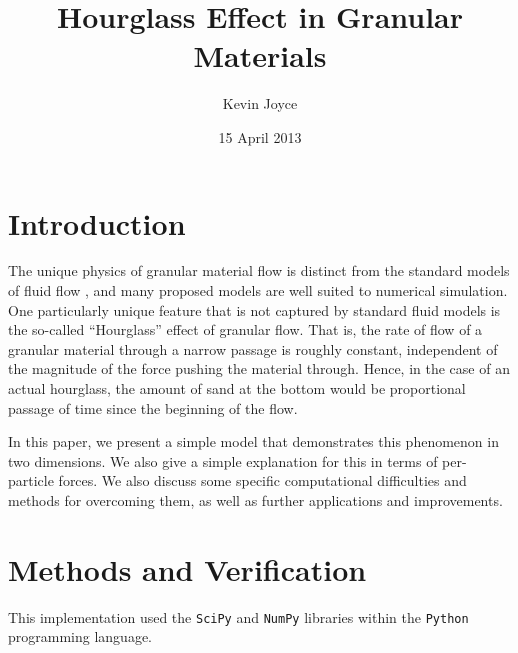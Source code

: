 \documentclass[12pt]{amsart}
\title{Hourglass Effect in Granular Materials}
\author{Kevin Joyce}
\date{15 April 2013}
\begin{document}
\maketitle
\section{Introduction}

The unique physics of granular material flow is distinct from the standard models of 
fluid flow \cite{bell}, and many proposed models are well suited to numerical
simulation. One particularly unique feature that is not captured by standard
fluid models is the so-called ``Hourglass'' effect of granular flow.  That is,
the rate of flow of a granular material through a narrow passage is roughly
constant, independent of the magnitude of the force pushing the material
through. Hence, in the case of an actual hourglass, the amount of sand at the
bottom would be proportional passage of time since the beginning of the flow.

In this paper, we present a simple model that demonstrates this phenomenon in
two dimensions.  We also give a simple explanation for this in terms of
per-particle forces.  We also discuss some specific computational difficulties 
and methods for overcoming them, as well as further applications and improvements.

\section{Methods and Verification} 
This implementation used the \texttt{SciPy} and \texttt{NumPy} \cite{scipy} libraries within the \texttt{Python} programming language.
\end{document}
